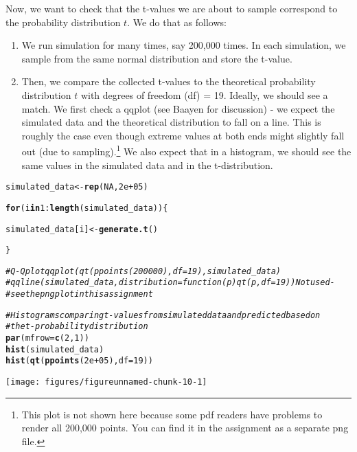 \documentclass{article}\usepackage[]{graphicx}\usepackage[]{color}
\makeatletter
\def\maxwidth{ %
  \ifdim\Gin@nat@width>\linewidth
    \linewidth
  \else
    \Gin@nat@width
  \fi
}
\newcommand{\hlnum}[1]{\textcolor[rgb]{0.686,0.059,0.569}{#1}}%
\newcommand{\hlcom}[1]{\textcolor[rgb]{0.678,0.584,0.686}{\textit{#1}}}%
\newcommand{\hlopt}[1]{\textcolor[rgb]{0,0,0}{#1}}%
\newcommand{\hlstd}[1]{\textcolor[rgb]{0.345,0.345,0.345}{#1}}%
\newcommand{\hlkwa}[1]{\textcolor[rgb]{0.161,0.373,0.58}{\textbf{#1}}}%
\newcommand{\hlkwb}[1]{\textcolor[rgb]{0.69,0.353,0.396}{#1}}%
\newcommand{\hlkwc}[1]{\textcolor[rgb]{0.333,0.667,0.333}{#1}}%
\newcommand{\hlkwd}[1]{\textcolor[rgb]{0.737,0.353,0.396}{\textbf{#1}}}%
\newenvironment{kframe}{%
 \def\at@end@of@kframe{}%
 \ifinner\ifhmode%
  \def\at@end@of@kframe{\end{minipage}}%
  \begin{minipage}{\columnwidth}%
 \fi\fi%
 \def\FrameCommand##1{\hskip\@totalleftmargin \hskip-\fboxsep
 \colorbox{shadecolor}{##1}\hskip-\fboxsep
     \hskip-\linewidth \hskip-\@totalleftmargin \hskip\columnwidth}%
 \MakeFramed {\advance\hsize-\width
   \@totalleftmargin\z@ \linewidth\hsize
   \@setminipage}}%
 {\par\unskip\endMakeFramed%
 \at@end@of@kframe}
\newenvironment{knitrout}{}{} %
\makeatother
\begin{document}
Now, we want to check that the t-values we are about to sample correspond to the probability distribution $t$. We do that as follows:

\begin{enumerate}
    \item We run simulation for many times, say 200,000 times. In each simulation, we sample from the same normal distribution and store the t-value.
    \item Then, we compare the collected t-values to the theoretical probability distribution $t$ with degrees of freedom (df) = 19. Ideally, we should see a match. We first check a qqplot (see Baayen for discussion) - we expect the simulated data and the theoretical distribution to fall on a line. This is roughly the case even though extreme values at both ends might slightly fall out (due to sampling).\footnote{This plot is not shown here because some pdf readers have problems to render all 200,000 points. You can find it in the assignment as a separate png file.} We also expect that in a histogram, we should see the same values in the simulated data and in the t-distribution.
\end{enumerate}

\begin{knitrout}
\color{fgcolor}\begin{kframe}
\begin{alltt}
\hlstd{simulated_data} \hlkwb{<-} \hlkwd{rep}\hlstd{(}\hlnum{NA}\hlstd{,} \hlnum{2e+05}\hlstd{)}

\hlkwa{for} \hlstd{(i} \hlkwa{in} \hlnum{1}\hlopt{:}\hlkwd{length}\hlstd{(simulated_data)) \{}

    \hlstd{simulated_data[i]} \hlkwb{<-} \hlkwd{generate.t}\hlstd{()}

\hlstd{\}}

\hlcom{# Q-Q plot qqplot(qt(ppoints(200000), df=19), simulated_data)}
\hlcom{# qqline(simulated_data, distribution= function(p) qt(p, df=19)) Not used -}
\hlcom{# see the png plot in this assignment}


\hlcom{# Histograms comparing t-values from simulated data and predicted based on}
\hlcom{# the t-probability distribution}
\hlkwd{par}\hlstd{(}\hlkwc{mfrow} \hlstd{=} \hlkwd{c}\hlstd{(}\hlnum{2}\hlstd{,} \hlnum{1}\hlstd{))}
\hlkwd{hist}\hlstd{(simulated_data)}
\hlkwd{hist}\hlstd{(}\hlkwd{qt}\hlstd{(}\hlkwd{ppoints}\hlstd{(}\hlnum{2e+05}\hlstd{),} \hlkwc{df} \hlstd{=} \hlnum{19}\hlstd{))}
\end{alltt}
\end{kframe}
\texttt{[image: figures/figureunnamed-chunk-10-1]} 

\end{knitrout}
\end{document}
